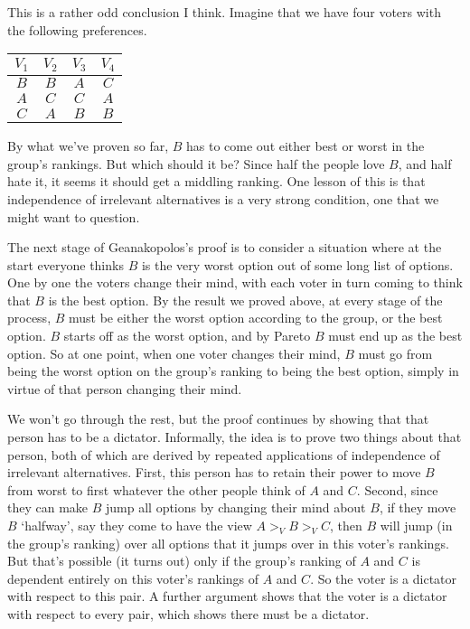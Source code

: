\documentclass[11pt,]{article}
\begin{document}
This is a rather odd conclusion I think. Imagine that we have four
voters with the following preferences.

\begin{longtable}[]{@{}cccc@{}}
\toprule
\(V_1\) & \(V_2\) & \(V_3\) & \(V_4\)\tabularnewline
\midrule
\endhead
\(B\) & \(B\) & \(A\) & \(C\)\tabularnewline
\(A\) & \(C\) & \(C\) & \(A\)\tabularnewline
\(C\) & \(A\) & \(B\) & \(B\)\tabularnewline
\bottomrule
\end{longtable}

By what we've proven so far, \(B\) has to come out either best or worst
in the group's rankings. But which should it be? Since half the people
love \(B\), and half hate it, it seems it should get a middling ranking.
One lesson of this is that independence of irrelevant alternatives is a
very strong condition, one that we might want to question.

The next stage of Geanakopolos's proof is to consider a situation where
at the start everyone thinks \(B\) is the very worst option out of some
long list of options. One by one the voters change their mind, with each
voter in turn coming to think that \(B\) is the best option. By the
result we proved above, at every stage of the process, \(B\) must be
either the worst option according to the group, or the best option.
\(B\) starts off as the worst option, and by Pareto \(B\) must end up as
the best option. So at one point, when one voter changes their mind,
\(B\) must go from being the worst option on the group's ranking to
being the best option, simply in virtue of that person changing their
mind.

We won't go through the rest, but the proof continues by showing that
that person has to be a dictator. Informally, the idea is to prove two
things about that person, both of which are derived by repeated
applications of independence of irrelevant alternatives. First, this
person has to retain their power to move \(B\) from worst to first
whatever the other people think of \(A\) and \(C\). Second, since they
can make \(B\) jump all options by changing their mind about \(B\), if
they move \(B\) `halfway', say they come to have the view
\(A >_V B >_V C\), then \(B\) will jump (in the group's ranking) over
all options that it jumps over in this voter's rankings. But that's
possible (it turns out) only if the group's ranking of \(A\) and \(C\)
is dependent entirely on this voter's rankings of \(A\) and \(C\). So
the voter is a dictator with respect to this pair. A further argument
shows that the voter is a dictator with respect to every pair, which
shows there must be a dictator.
\end{document}
